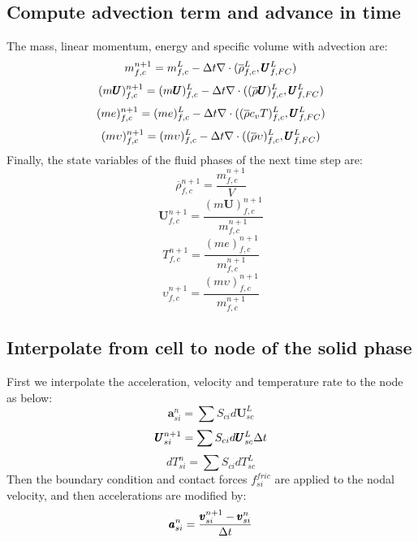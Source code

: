 \documentclass[preprint,12pt]{elsarticle}
\begin{document}
\subsection{\textsf{Compute advection term and advance in time}}
The mass, linear momentum, energy and specific volume with advection are:
%
%
\begin{equation}
 m_{f,c}^{n+1} = m_{f,c}^L - \Delta{t}  \nabla \cdot (\overline{\rho}_{f,c}^L,\pmb{U}_{f,FC}^{L})
\end {equation}
%
%
\begin{equation}
 (m \pmb{U})_{f,c}^{n+1} = (m \pmb{U})_{f,c}^L - \Delta{t}  \nabla \cdot ((\overline{\rho} \pmb{U})_{f,c}^L,\pmb{U}_{f,FC}^{L})
\end {equation}
%
%
\begin{equation}
 (me)_{f,c}^{n+1} = (me)_{f,c}^L - \Delta{t}  \nabla \cdot ((\overline{\rho} c_v T)_{f,c}^L,\pmb{U}_{f,FC}^{L})
\end {equation}
%
%
\begin{equation}
 (m \upsilon)_{f,c}^{n+1} = (m \upsilon)_{f,c}^L - \Delta{t}  \nabla \cdot ((\overline{\rho} \upsilon)_{f,c}^L,\pmb{U}_{f,FC}^{L})
\end {equation}
%
%
Finally, the state variables of the fluid phases of the next time step are:
%
%
\begin{equation}
\overline{\rho}_{f,c}^{n+1} = \frac{m_{f,c}^{n+1}} {V}
\end {equation}
%
%
\begin{equation}
 \pmb{U}_{f,c}^{n+1} = \frac{(m \pmb{U})_{f,c}^{n+1}}{m_{f,c}^{n+1}} 
\end {equation}
%
%
\begin{equation}
 T_{f,c}^{n+1} = \frac{(me)_{f,c}^{n+1}}{m_{f,c}^{n+1}}
\end {equation}
%
%
\begin{equation}
 \upsilon_{f,c}^{n+1} = \frac{(m \upsilon)_{f,c}^{n+1}}{m_{f,c}^{n+1}}
\end {equation}
%
%
\subsection{\textsf{Interpolate from cell to node of the solid phase}}
%
First we interpolate the acceleration, velocity and temperature rate to the node as below:
%
%
\begin{equation}
 \pmb{a}_{si}^n = \sum{S_{ci} d\pmb{U}_{sc}^L}
\end {equation}
%
%
\begin{equation}
 \pmb{U}_{si}^{n+1} = \sum{S_{ci} d\pmb{U}_{sc}^L} \Delta{t}
\end {equation}
%
\begin{equation}
 dT_{si}^n =  \sum{S_{ci} dT_{sc}^L}
\end {equation}
%
%
Then the boundary condition and contact forces $f_{si}^{fric}$ are applied to the nodal velocity, and then accelerations are modified by:
%
%
\begin{equation}
     \pmb{a}_{si}^n = \frac{\pmb{v}_{si}^{n+1} - \pmb{v}_{si}^n}{\Delta{t}}
\end {equation}
%
%
\end{document}
